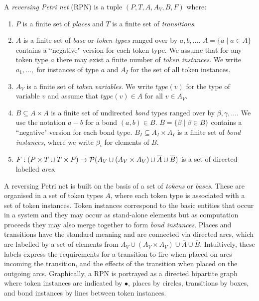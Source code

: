 \documentclass[runningheads]{llncs}
\newcommand{\PN}{reversing Petri net }
\newcommand{\bond}{\!-\!}
\newcommand{\type}{\mathit{type}}
\begin{document}
\begin{definition}{\rm
		A \emph{\PN}(RPN) is a tuple $(P,T,  A, A_V, B, F)$ where:
		\begin{enumerate}
			\item $P$ is a finite set of \emph{places} and
			$T$ is a finite set of \emph{transitions}.
			\item $A$ is a finite set of \emph{base} or \emph{token types} ranged over by $a, b,\ldots$.
			$\overline{A} = 
			\{\overline{a}\mid a\in A\}$ contains a ``negative"  version for each token type. We assume that
			for any token type $a$ there may exist a finite number of \emph{token instances}. 
			We write $a_1,\ldots,$ for
			instances of type $a$ and $A_I$ for the set of all token instances. 
			\item $A_V$ is a finite set of \emph{token variables}. We write $\type(v)$ for the type
			of variable $v$ and assume that $\type(v) \in A$ for all $v\in A_V$.
			\item $B\subseteq A\times A$ is a finite set of undirected \emph{bond} types ranged over
			by $\beta,\gamma,\ldots$. We use the notation $a \bond b$ for a bond $(a,b)\in B$.  
			$\overline{B} = \{\overline{\beta}\mid \beta\in B\}$ contains a ``negative" version for 
			each bond type. $B_I\subseteq A_I\times A_I$ is a finite set of \emph{bond instances},
			where we write $\beta_i$ 
			for elements of $B$.
			\item $F : (P\times T  \cup T \times P)\rightarrow {\cal P}( A_V \cup (A_V \times A_V) \cup \overline{A}
			\cup \overline{B}) $ 
			is a set of directed labelled \emph{arcs}.
		\end{enumerate}
}\end{definition}

A reversing Petri net is built on the basis of a set of \emph{tokens} or \emph{bases}. These
are organised in a set of token types $A$, where each token type is associated with a set of token instances.
Token instances correspond to the basic entities that occur in a system and they may occur as 
stand-alone elements but as computation proceeds they may also merge together to form \emph{bond 
	instances}. 
Places and transitions have the standard meaning and are connected
via directed arcs, which are labelled by a set of elements from $A_V \cup (A_V \times A_V) \cup \overline{A}
\cup \overline{B}$.  Intuitively, these labels express the requirements for a transition
to fire when placed on arcs incoming the transition, and the effects of the transition when placed on the
outgoing arcs. 
Graphically, a RPN is portrayed as a directed bipartite graph where token instances are indicated by $\bullet$, places by
circles, transitions by boxes, and bond instances by lines between token instances. 
\end{document}
